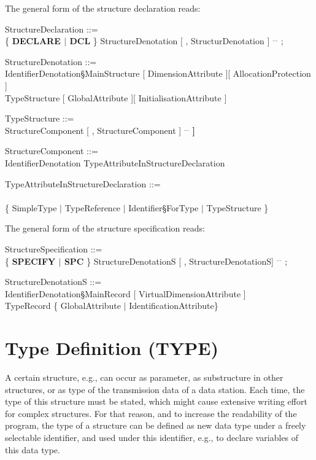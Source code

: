 The general form of the structure declaration reads:

StructureDeclaration ::=\\
\x \{ {\bf DECLARE $\mid$ DCL} \} StructureDenotation [ , StructurDenotation ] $^{...}$ ;

StructureDenotation ::=\\
\x IdentifierDenotation\S MainStructure [ DimensionAttribute ][ AllocationProtection ]\\
\x TypeStructure [ GlobalAttribute ][ InitialisationAttribute ]

TypeStructure ::=\\
\x {\bf STRUCT [} StructureComponent [ , StructureComponent ] $^{...}$ {\bf ]}

StructureComponent ::=\\
\x IdentifierDenotation TypeAttributeInStructureDeclaration

TypeAttributeInStructureDeclaration ::=\\
\x [ DimensionAttribute ] \\
\x \{ SimpleType $\mid$ TypeReference $\mid$ Identifier\S ForType $\mid$ TypeStructure \}

The general form of the structure specification reads:

StructureSpecification ::=\\
\x \{ {\bf SPECIFY $\mid$ SPC} \} StructureDenotationS [ , StructureDenotationS] $^{...}$ ;

StructureDenotationS ::=\\
\x IdentifierDenotation\S MainRecord [ VirtualDimensionAttribute ]\\
\x [ AllocationProtection ] TypeRecord \{ GlobalAttribute $\mid$ IdentificationAttribute\}


\section{Type Definition (TYPE)} %

A certain structure, e.g., can occur as parameter, as substructure in other
structures, or as type of the transmission data of a data station.  Each
time, the type of this structure must be stated, which might cause
extensive writing effort for complex structures. For that reason, and to
increase the readability of the program, the type of a structure can be
defined as new data type under a freely selectable identifier, and used
under this identifier, e.g., to declare variables of this data type.

